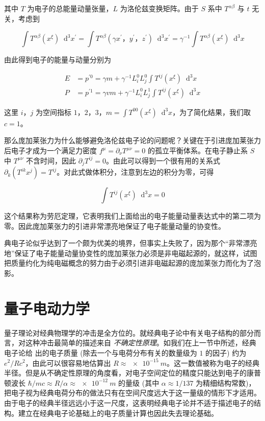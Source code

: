 \documentclass[oneside,a4paper,openany,11pt]{ctexbook}
\newcommand*{\dif}{\mathop{}\!\mathrm{d}} %
\begin{document}
\noindent 其中 $T$ 为电子的总能量动量张量，$L$ 为洛伦兹变换矩阵。由于 $S$ 系中 $T^{\alpha\beta}$ 与 $t$ 无关，考虑到

\begin{equation}
    \int T^{\alpha\beta} (x^\xi) \dif^3 x^\prime = \int T^{\alpha\beta} (\gamma x^\prime，y^\prime，z^\prime) \dif^3 x^\prime = \gamma^{-1} \int T^{\alpha\beta} (x^\xi) \dif^3 x
\end{equation}

由此得到电子的能量与动量分别为

\begin{align}
    E &= p^{\prime 0} = \gamma m + \gamma^{-1} L_i^0 L_j^0 \int T^{ij} (x^\xi) \dif^3 x \\
    P &= p^{\prime 1} = \gamma v m + \gamma^{-1} L_i^0 L_j^1 \int T^{ij} (x^\xi) \dif^3 x
\end{align}

这里 $i，j$ 为空间指标 $1，2，3$，$m=\int T^{00} (x^\xi) \dif^3 x$，为了简化结果，我们取 $c=1$。

那么庞加莱张力为什么能够避免洛伦兹电子论的问题呢？关键在于引进庞加莱张力后电子才成为一个满足力密度 $f^\mu = \partial_\nu T^{\mu\nu}=0$ 的孤立平衡体系。在电子静止系 $S$ 中 $T^{\mu\nu}$ 不含时间，因此 $\partial_j T^{ij}=0$。由此可以得到一个很有用的关系式 $\partial_k (T^{ik} x^j)=T^{ij}$。对此式做体积分，注意到左边的积分为零，可得

\begin{equation}
    \int T^{ij} (x^\xi) \dif^3 x = 0
\end{equation}

这个结果称为劳厄定理，它表明我们上面给出的电子能量动量表达式中的第二项为零。因此庞加莱张力的引进非常漂亮地保证了电子能量动量的协变性。

典电子论似乎达到了一个颇为优美的境界，但事实上失败了，因为那个“非常漂亮地”保证了电子能量动量协变性的庞加莱张力必须是非电磁起源的，就这样，试图把质量约化为纯电磁概念的努力由于必须引进非电磁起源的庞加莱张力而化为了泡影。

\section{量子电动力学}

量子理论对经典物理学的冲击是全方位的。就经典电子论中有关电子结构的部分而言，对这种冲击最简单的描述来自 \emph{不确定性原理}。如我们在上一节中所述，经典电子论给
出的电子质量 (除去一个与电荷分布有关的数量级为 $1$ 的因子) 约为 $e^2/R c^2$，由此可以很容易地估算出 $R \approx \qty{e-15}{m}$。这一数值被称为电子的经典半径。但是从不确定性原理的角度看，对电子空间定位的精度只能达到电子的康普顿波长 $\hbar/mc \approx R/\alpha \approx \qty{e-12}{m}$ 的量级 (其中 $\alpha\approx 1/137$ 为精细结构常数)，把电子视为经典电荷分布的做法只有在空间尺度远大于这一量级的情形下才适用。由于电子的经典半径远远小于这一尺度，这表明经典电子论并不适于描述电子的结构。建立在经典电子论基础上的电子质量计算也因此失去理论基础。
\end{document}
